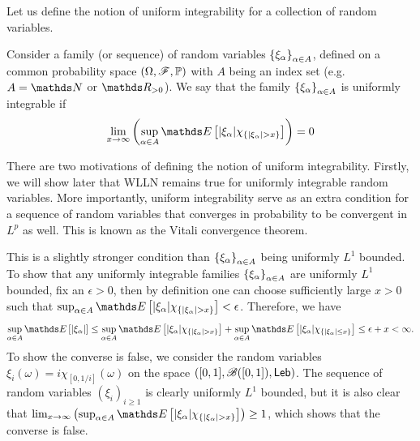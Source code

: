 \begin{unexaminable}
Let us define the notion of uniform integrability for a collection of random variables.

\begin{definition}
Consider a family (or sequence) of random variables $\left\{ \xi_\alpha \right \}_{\alpha \in A}$, defined on a common probability space $(\Omega,\mathcal{F},\mathbb{P})$ with $A$ being an index set (e.g. $A = \N$ or $\R_{>0}$). We say that the family $\left\{ \xi_\alpha \right \}_{\alpha \in A}$ is uniformly integrable if 
\begin{equation}
    \lim_{x \to \infty} \bracket{\sup_{\alpha \in A} \E\sqbracket{|\xi_\alpha| \chi_{\set{|\xi_\alpha| > x}}}} = 0
\end{equation}
\end{definition}

There are two motivations of defining the notion of uniform integrability. Firstly, we will show later that WLLN remains true for uniformly integrable random variables. More importantly, uniform integrability serve as an extra condition for a sequence of random variables that converges in probability to be convergent in $L^p$ as well. This is known as the Vitali convergence theorem.

\begin{remark} \label{rmk:uniform_L1_bounded}
This is a slightly stronger condition than $\left\{ \xi_\alpha \right \}_{\alpha \in A}$ being uniformly $L^1$ bounded. To show that any uniformly integrable families $\left\{ \xi_\alpha \right \}_{\alpha \in A}$ are uniformly $L^1$ bounded, fix an $\epsilon > 0$, then by definition one can choose sufficiently large $x > 0$ such that $\sup_{\alpha \in A} \E\sqbracket{|\xi_\alpha| \chi_{\set{|\xi_\alpha| > x}}} < \epsilon$. Therefore, we have 
\begin{equation*}
\sup_{\alpha \in A} \E\sqbracket{\abs{\xi_\alpha}} \leq \sup_{\alpha \in A} \E\sqbracket{|\xi_\alpha| \chi_{\set{|\xi_\alpha| > x}}} + \sup_{\alpha \in A} \E\sqbracket{|\xi_\alpha| \chi_{\set{|\xi_\alpha| \leq x}}} \leq \epsilon + x < \infty.
\end{equation*}
To show the converse is false, we consider the random variables $\xi_i(\omega) = i \chi_{[0,1/i]}(\omega)$ on the space $([0,1], \mathcal{B}([0,1]), \mathsf{Leb})$. The sequence of random variables $(\xi_i)_{i\geq 1}$ is clearly uniformly $L^1$ bounded, but it is also clear that $\lim_{x \to \infty} \bracket{\sup_{\alpha \in A} \E\sqbracket{|\xi_\alpha| \chi_{\set{|\xi_\alpha| > x}}}} \geq 1$, which shows that the converse is false.
\end{remark}


\end{unexaminable}
